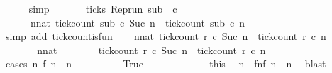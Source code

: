 \begin{isabellebody}
\ \ \ \ \isamarkupfalse%
\ simp\isanewline
\ \ \isamarkupfalse%
\isanewline
\ \ \ \ {}{\isacharcolon}{\isacartoucheopen}{\isacharparenleft}{\isasymnot}ticks\ {\isacharparenleft}{\isacharparenleft}Rep{\isacharunderscore}run\ sub{\isacharparenright}\ {}\ c\isanewline
\ \ \ \ \ {\isasymand}\ {\isacharparenleft}{\isasymforall}n{\isacharcolon}{\isacharcolon}nat{\isachardot}\ {\isacharparenleft}tick{\isacharunderscore}count\ sub\ c\ {\isacharparenleft}Suc\ n{\isacharparenright}{\isacharparenright}\ {\isasymle}\ {\isacharparenleft}tick{\isacharunderscore}count\ sub\ c\ n{\isacharparenright}{\isacharparenright}{\isacartoucheclose}\isanewline
\ \ \isamarkupfalse%
\ {\isacharparenleft}simp\ add{\isacharcolon}\ tick{\isacharunderscore}count{\isacharunderscore}is{\isacharunderscore}fun{\isacharparenright}\isanewline
\ \ \isamarkupfalse%
\ {\isacartoucheopen}{\isasymforall}n{\isacharcolon}{\isacharcolon}nat{\isachardot}\ {\isacharparenleft}tick{\isacharunderscore}count\ r\ c\ {\isacharparenleft}Suc\ n{\isacharparenright}{\isacharparenright}\ {\isasymle}\ {\isacharparenleft}tick{\isacharunderscore}count\ r\ c\ n{\isacharparenright}{\isacartoucheclose}\isanewline
\ \ \isamarkupfalse%
\ {\isacharminus}\isanewline
\ \ \ \ \isacommand{{\isacharbraceleft}}\isamarkupfalse%
\ \isamarkupfalse%
\ n{\isacharcolon}{\isacharcolon}nat\isanewline
\ \ \ \ \ \ \isamarkupfalse%
\ {\isacartoucheopen}tick{\isacharunderscore}count\ r\ c\ {\isacharparenleft}Suc\ n{\isacharparenright}\ {\isasymle}\ tick{\isacharunderscore}count\ r\ c\ n{\isacartoucheclose}\isanewline
\ \ \ \ \ \ \isamarkupfalse%
\ {\isacharparenleft}cases\ {\isacartoucheopen}{\isasymexists}n\ f\ n\ {\isacharequal}\ n{\isacartoucheclose}{\isacharparenright}\isanewline
\ \ \ \ \ \ \ \ \isamarkupfalse%
\ True\ %
\isanewline
\ \ \ \ \ \ \ \ \ \ \isamarkupfalse%
\ this\ \isamarkupfalse%
\ n\ \ fn{\isacharcolon}{\isacartoucheopen}f\ n\ {\isacharequal}\ n{\isacartoucheclose}\ \isamarkupfalse%
\ blast\isanewline
\ \ \ \ \ \ \ \ \ \ \isamarkupfalse%

\end{isabellebody}
